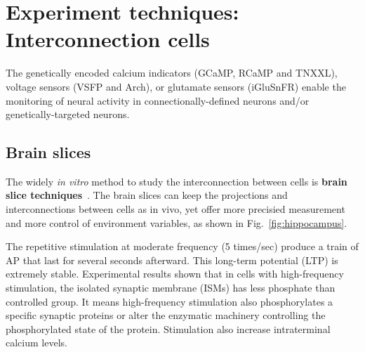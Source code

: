 \section{Experiment techniques: Interconnection cells}
\label{sec:interc-cells}

The genetically encoded calcium indicators (GCaMP, RCaMP and TNXXL),
voltage sensors (VSFP and Arch), or glutamate sensors (iGluSnFR) enable
the monitoring of neural activity in connectionally-defined neurons and/or
genetically-targeted neurons.




\subsection{Brain slices}
\label{sec:brain-slice}

The widely {\it in vitro} method to study the interconnection between cells is
{\bf brain slice
  techniques}~\cite{rao2004bst, lynch1980ubs, schurr1986bsp, becker2006eub}.
The brain slices can keep the projections and interconnections between cells as
in vivo, yet offer more precisied measurement and more control of environment
variables, as shown in Fig.~\ref{fig:hippocampus}.

The repetitive stimulation at moderate frequency (5 times/sec) produce
a train of AP that last for several seconds afterward. This long-term
potential (LTP) is extremely stable. Experimental results shown that
in cells with high-frequency stimulation, the isolated synaptic
membrane (ISMs) has less phosphate than controlled group. It means
high-frequency stimulation also phosphorylates a specific synaptic
proteins or alter the enzymatic machinery controlling the
phosphorylated state of the protein.
Stimulation also increase intraterminal calcium levels. 






